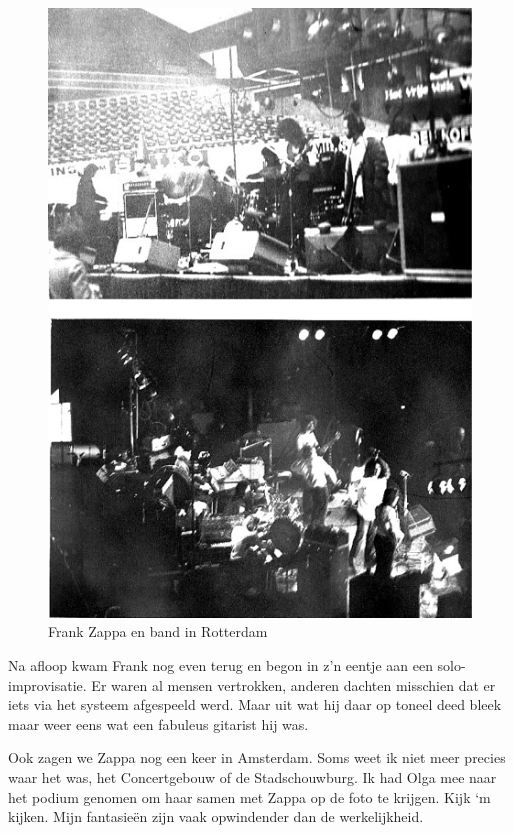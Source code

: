 \documentclass[10pt,twoside, openright]{memoir}
\begin{document}
\begin{figure}
\includegraphics[width=\textwidth]{img/ch31/zappa}
\caption*{\footnotesize Frank Zappa en band in Rotterdam}
\end{figure} 


Na afloop kwam Frank nog even terug en begon in z’n eentje aan een solo-improvisatie. Er waren al mensen vertrokken, anderen dachten misschien dat er iets via het systeem afgespeeld werd. Maar uit wat hij daar op toneel deed bleek maar weer eens wat een fabuleus gitarist hij was.

Ook zagen we Zappa nog een keer in Amsterdam. Soms weet ik niet meer precies waar het was, het Concertgebouw of de Stadschouwburg. Ik had Olga mee naar het podium genomen om haar samen met Zappa op de foto te krijgen. Kijk ‘m kijken. Mijn fantasieën zijn vaak opwindender dan de werkelijkheid.
\end{document}
